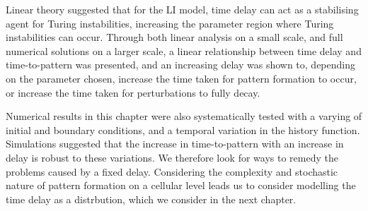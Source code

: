 Linear theory suggested that for the LI model, time delay can act as a stabilising agent for Turing instabilities, increasing the parameter region where Turing instabilities can occur. Through both linear analysis on a small scale, and full numerical solutions on a larger scale, a linear relationship between time delay and time-to-pattern was presented, and an increasing delay was shown to, depending on the parameter chosen, increase the time taken for pattern formation to occur, or increase the time taken for perturbations to fully decay.

Numerical results in this chapter were also systematically tested with a varying of initial and boundary conditions, and a temporal variation in the history function. Simulations suggested that the increase in time-to-pattern with an increase in delay is robust to these variations. We therefore look for ways to remedy the problems caused by a fixed delay. Considering the complexity and stochastic nature of pattern formation on a cellular level leads us to consider modelling the time delay as a distrbution, which we consider in the next chapter.

